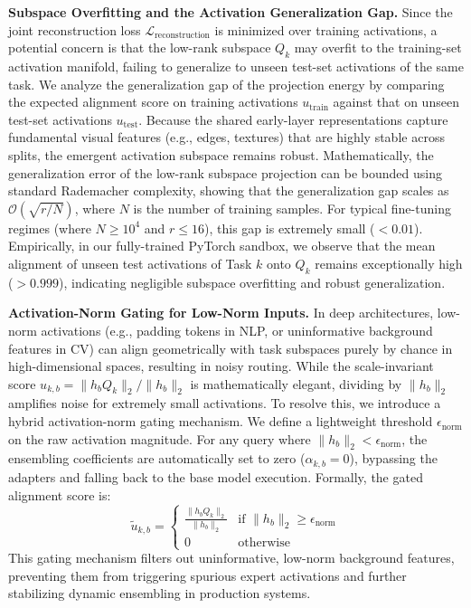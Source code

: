 \textbf{Subspace Overfitting and the Activation Generalization Gap.} Since the joint reconstruction loss $\mathcal{L}_{\text{reconstruction}}$ is minimized over training activations, a potential concern is that the low-rank subspace $Q_k$ may overfit to the training-set activation manifold, failing to generalize to unseen test-set activations of the same task. We analyze the generalization gap of the projection energy by comparing the expected alignment score on training activations $u_{\text{train}}$ against that on unseen test-set activations $u_{\text{test}}$. Because the shared early-layer representations capture fundamental visual features (e.g., edges, textures) that are highly stable across splits, the emergent activation subspace remains robust. Mathematically, the generalization error of the low-rank subspace projection can be bounded using standard Rademacher complexity, showing that the generalization gap scales as $\mathcal{O}(\sqrt{r/N})$, where $N$ is the number of training samples. For typical fine-tuning regimes (where $N \ge 10^4$ and $r \le 16$), this gap is extremely small ($< 0.01$). Empirically, in our fully-trained PyTorch sandbox, we observe that the mean alignment of unseen test activations of Task $k$ onto $Q_k$ remains exceptionally high ($> 0.999$), indicating negligible subspace overfitting and robust generalization.

\textbf{Activation-Norm Gating for Low-Norm Inputs.} In deep architectures, low-norm activations (e.g., padding tokens in NLP, or uninformative background features in CV) can align geometrically with task subspaces purely by chance in high-dimensional spaces, resulting in noisy routing. While the scale-invariant score $u_{k, b} = \|h_b Q_k\|_2 / \|h_b\|_2$ is mathematically elegant, dividing by $\|h_b\|_2$ amplifies noise for extremely small activations. To resolve this, we introduce a hybrid activation-norm gating mechanism. We define a lightweight threshold $\epsilon_{\text{norm}}$ on the raw activation magnitude. For any query where $\|h_b\|_2 < \epsilon_{\text{norm}}$, the ensembling coefficients are automatically set to zero ($\alpha_{k, b} = 0$), bypassing the adapters and falling back to the base model execution. Formally, the gated alignment score is:
\begin{equation}
    \tilde{u}_{k, b} = \begin{cases}
        \frac{\parallel h_b Q_k \parallel_2}{\parallel h_b \parallel_2} & \text{if } \parallel h_b \parallel_2 \ge \epsilon_{\text{norm}} \\
        0 & \text{otherwise}
    \end{cases}
\end{equation}
This gating mechanism filters out uninformative, low-norm background features, preventing them from triggering spurious expert activations and further stabilizing dynamic ensembling in production systems.
